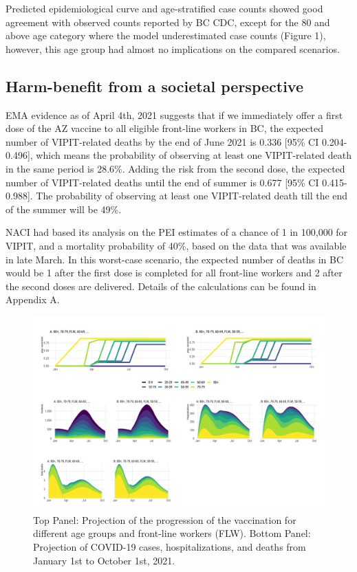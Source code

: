 \documentclass[]{interact}
\theoremstyle{plain}%
\theoremstyle{definition}
\theoremstyle{remark}
\begin{document}
Predicted epidemiological curve and age-stratified case counts showed
good agreement with observed counts reported by BC CDC, except for the
80 and above age category where the model underestimated case counts
(Figure 1), however, this age group had almost no implications on the
compared scenarios.

\hypertarget{harm-benefit-from-a-societal-perspective}{%
\subsection{Harm-benefit from a societal
perspective}\label{harm-benefit-from-a-societal-perspective}}

EMA evidence as of April 4th, 2021 suggests that if we immediately offer
a first dose of the AZ vaccine to all eligible front-line workers in BC,
the expected number of VIPIT-related deaths by the end of June 2021 is
0.336 {[}95\% CI 0.204-0.496{]}, which means the probability of
observing at least one VIPIT-related death in the same period is 28.6\%.
Adding the risk from the second dose, the expected number of
VIPIT-related deaths until the end of summer is 0.677 {[}95\% CI
0.415-0.988{]}. The probability of observing at least one VIPIT-related
death till the end of the summer will be 49\%.

NACI had based its analysis on the PEI estimates of a chance of 1 in
100,000 for VIPIT, and a mortality probability of 40\%, based on the
data that was available in late March. In this worst-case scenario, the
expected number of deaths in BC would be 1 after the first dose is
completed for all front-line workers and 2 after the second doses are
delivered. Details of the calculations can be found in Appendix A.

\begin{figure}

{\centering \includegraphics[width=1\linewidth]{../figures/fig-trajectoriesFull} 

}

\caption{Top Panel: Projection of the progression of the vaccination for different age groups and front-line workers (FLW). Bottom Panel: Projection of COVID-19 cases, hospitalizations, and deaths from January 1st to October 1st, 2021.}\label{fig:fig1}
\end{figure}
\end{document}
